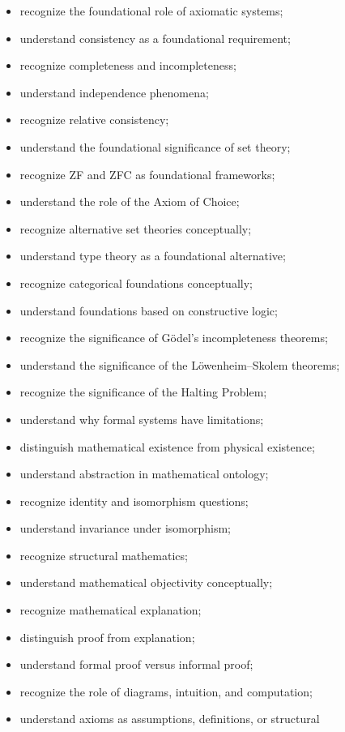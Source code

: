 {\begin{itemize}
    \item recognize the foundational role of axiomatic systems;
    \item understand consistency as a foundational requirement;
    \item recognize completeness and incompleteness;
    \item understand independence phenomena;
    \item recognize relative consistency;
    \item understand the foundational significance of set theory;
    \item recognize ZF and ZFC as foundational frameworks;
    \item understand the role of the Axiom of Choice;
    \item recognize alternative set theories conceptually;
    \item understand type theory as a foundational alternative;
    \item recognize categorical foundations conceptually;
    \item understand foundations based on constructive logic;
    \item recognize the significance of Gödel's incompleteness theorems;
    \item understand the significance of the Löwenheim--Skolem theorems;
    \item recognize the significance of the Halting Problem;
    \item understand why formal systems have limitations;
    \item distinguish mathematical existence from physical existence;
    \item understand abstraction in mathematical ontology;
    \item recognize identity and isomorphism questions;
    \item understand invariance under isomorphism;
    \item recognize structural mathematics;
    \item understand mathematical objectivity conceptually;
    \item recognize mathematical explanation;
    \item distinguish proof from explanation;
    \item understand formal proof versus informal proof;
    \item recognize the role of diagrams, intuition, and computation;
    \item understand axioms as assumptions, definitions, or structural

\end{itemize}}
